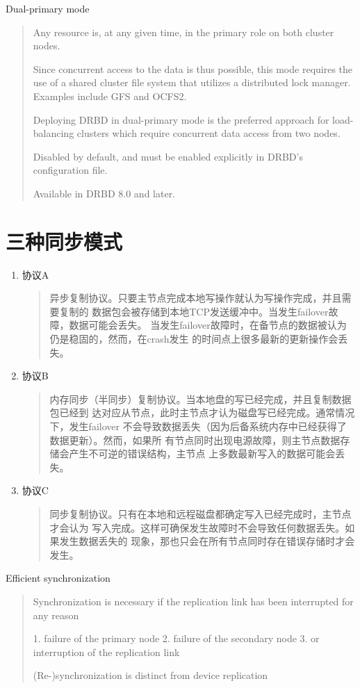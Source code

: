 Dual-primary mode
\begin{quote}
Any resource is, at any given time, in the primary role on both
cluster nodes.

Since concurrent access to the data is thus possible, this mode
requires the use of a shared cluster file system that utilizes a
distributed lock manager. Examples include GFS and OCFS2.

Deploying DRBD in dual-primary mode is the preferred approach for
load-balancing clusters which require concurrent data access from two
nodes.

Disabled by default, and must be enabled explicitly in DRBD's
configuration file.

Available in DRBD 8.0 and later.
\end{quote}
 
\section{三种同步模式}

\begin{enumerate}[itemsep=0pt,parsep=0pt]
\item 协议A
\begin{quote}
异步复制协议。只要主节点完成本地写操作就认为写操作完成，并且需要复制的
数据包会被存储到本地TCP发送缓冲中。当发生failover故障，数据可能会丢失。
当发生failover故障时，在备节点的数据被认为仍是稳固的，然而，在crash发生
的时间点上很多最新的更新操作会丢失。
\end{quote}

\item 协议B
\begin{quote}
内存同步（半同步）复制协议。当本地盘的写已经完成，并且复制数据包已经到
达对应从节点，此时主节点才认为磁盘写已经完成。通常情况下，发生failover
不会导致数据丢失（因为后备系统内存中已经获得了数据更新）。然而，如果所
有节点同时出现电源故障，则主节点数据存储会产生不可逆的错误结构，主节点
上多数最新写入的数据可能会丢失。
\end{quote}

\item 协议C
\begin{quote}
同步复制协议。只有在本地和远程磁盘都确定写入已经完成时，主节点才会认为
写入完成。这样可确保发生故障时不会导致任何数据丢失。如果发生数据丢失的
现象，那也只会在所有节点同时存在错误存储时才会发生。
\end{quote}
\end{enumerate}

Efficient synchronization
\begin{quote}
Synchronization is necessary if the replication link has been
interrupted for any reason

1. failure of the primary node
2. failure of the secondary node
3. or interruption of the replication link

(Re-)synchronization is distinct from device replication
\end{quote}

